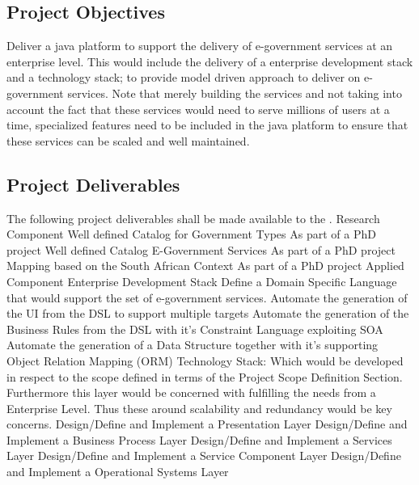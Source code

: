 \subsection{Project Objectives}
Deliver a java platform to support the delivery of e-government services at an enterprise level. This would include the delivery of a enterprise development stack and a technology stack; to provide   model driven approach to deliver on e-government services.  Note that merely building the services and not taking into account the fact that these services would need to serve millions of users at a time, specialized features need to be included in the java platform to ensure that these services can be scaled and well maintained. 
\subsection{Project Deliverables}
The following project deliverables shall be made available to the \client.
\slist
\spit Research Component
\slist
\spit Well defined Catalog for Government Types {As part of a PhD project}
\spit Well defined Catalog E-Government Services {As part of a PhD project}
\spit Mapping based on the South African Context {As part of a PhD project}
\elist
\spit Applied Component
\slist
\spit Enterprise Development Stack
\slist
\spit Define a Domain Specific Language that would support the set of e-government services.
\spit Automate the generation of the UI from the DSL to support multiple targets
\spit Automate the generation of the Business Rules from the DSL with it's Constraint Language exploiting SOA
\spit Automate the generation of a Data Structure together with it's supporting Object Relation Mapping (ORM)
\elist
\spit Technology Stack: Which would be developed in respect to the scope defined in terms of the Project Scope Definition Section. Furthermore this layer would be concerned with fulfilling the needs from a Enterprise Level. Thus these around scalability and redundancy would be key concerns.
\slist
\spit Design/Define and Implement a Presentation Layer 
\spit Design/Define and Implement a Business Process Layer
\spit Design/Define and Implement a Services Layer
\spit Design/Define and Implement a Service Component Layer
\spit Design/Define and Implement a Operational Systems Layer
\elist
\elist
\elist
